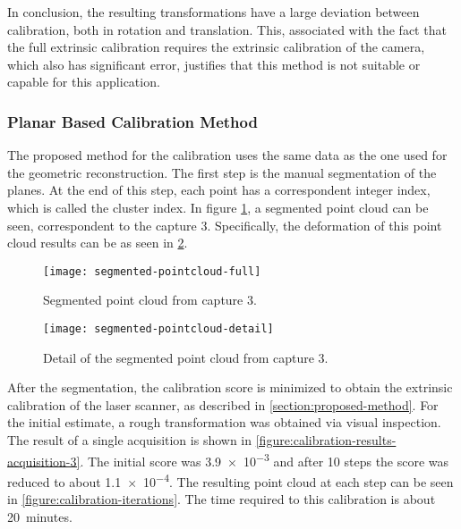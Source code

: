 In conclusion, the resulting transformations have a large deviation between calibration, both in rotation and translation. This, associated with the fact that the full extrinsic calibration requires the extrinsic calibration of the camera, which also has significant error, justifies that this method is not suitable or capable for this application. 

\subsubsection{Planar Based Calibration Method}

The proposed method for the calibration uses the same data as the one used for the geometric reconstruction. The first step is the manual segmentation of the planes. At the end of this step, each point has a correspondent integer index, which is called the cluster index.  In figure \cref{figure:segmented-pointcloud-full}, a segmented point cloud can be seen, correspondent to the capture 3. Specifically, the deformation of this point cloud results can be as seen in \cref{figure:segmented-pointcloud-detail}.

\begin{figure}[h]
    
    \centering
    \texttt{[image: segmented-pointcloud-full]}
    \caption{Segmented point cloud from capture 3.}
    \label{figure:segmented-pointcloud-full}

\end{figure}

\begin{figure}[h]
    \centering
    \texttt{[image: segmented-pointcloud-detail]}
    \caption{Detail of the segmented point cloud from capture 3.}
    \label{figure:segmented-pointcloud-detail}

\end{figure}

After the segmentation, the calibration score is minimized to obtain the extrinsic calibration of the laser scanner, as described in \cref{section:proposed-method}. For the initial estimate, a rough transformation was obtained via visual inspection. The result of a single acquisition is shown in \cref{figure:calibration-results-acquisition-3}. The initial score was \num{3.9e-3} and after 10 steps the score was reduced to about \num{1.1e-4}. The resulting point cloud at each step can be seen in \cref{figure:calibration-iterations}. The time required to this calibration is about \num{20}~minutes.

